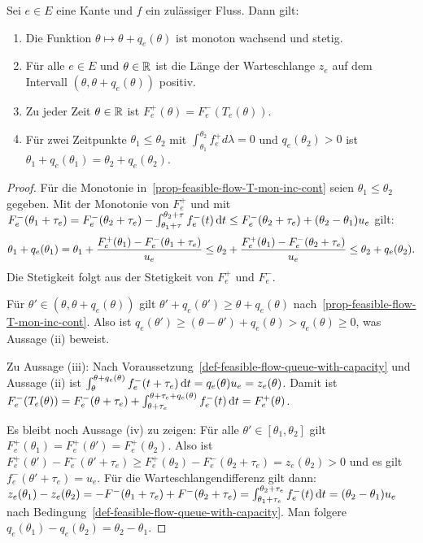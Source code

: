 \begin{proposition}\label{prop-feasible-flow}
	Sei $e\in E$ eine Kante und $f$ ein zulässiger Fluss. Dann gilt:
	\begin{enumerate}[label=(\roman*)]
		\item\label{prop-feasible-flow-T-mon-inc-cont} Die Funktion $\theta \mapsto \theta + q_e(\theta)$ ist monoton wachsend und stetig.
		\item\label{prop-feasible-flow-positive-queue} Für alle $e\in E$ und $\theta\in\mathbb{R}$ ist die Länge der Warteschlange $z_e$ auf dem Intervall $(\theta, \theta + q_e(\theta))$ positiv.
		\item\label{prop-feasible-flow-det-outflow} Zu jeder Zeit $\theta\in\mathbb{R}$ ist $F_e^+(\theta) = F_e^-(T_e(\theta))$.
		\item\label{prop-feasible-flow-queue-delay} Für zwei Zeitpunkte $\theta_1 \leq \theta_2$ mit $\int_{\theta_1}^{\theta_2} f^+_e d\lambda = 0$ und $q_e(\theta_2)>0$ ist $\theta_1 + q_e(\theta_1) = \theta_2 + q_e(\theta_2)$.
	\end{enumerate}
\end{proposition}
\begin{proof}
	Für die Monotonie in~\ref{prop-feasible-flow-T-mon-inc-cont} seien $\theta_1 \leq \theta_2$ gegeben.
	Mit der Monotonie von $F_e^+$ und mit $F_e^-(\theta_1 + \tau_e) = F_e^-(\theta_2+\tau_e) - \int_{\theta_1+\tau}^{\theta_2+\tau} f_e^-(t)\mathop{}\!\mathrm{d} t\leq F_e^-(\theta_2 + \tau_e) + (\theta_2 - \theta_1)u_e$ gilt: 
	$$
		\theta_1 + q_e(\theta_1)
		= \theta_1 + \frac{F_e^+(\theta_1) - F_e^-(\theta_1 + \tau_e)}{u_e}\\
		\leq \theta_2 + \frac{F_e^+(\theta_1) - F_e^-(\theta_2+\tau_e)}{u_e} \leq \theta_2 + q_e(\theta_2).
	$$
	Die Stetigkeit folgt aus der Stetigkeit von $F_e^+$ und $F_e^-$.
	
	Für $\theta'\in (\theta, \theta+q_e(\theta))$ gilt $\theta' + q_e(\theta') \geq \theta + q_e(\theta)$ nach~\ref{prop-feasible-flow-T-mon-inc-cont}.
	Also ist $q_e(\theta') \geq (\theta - \theta') + q_e(\theta) > q_e(\theta)\geq 0$, was Aussage (ii) beweist.	
	
	Zu Aussage (iii): Nach Voraussetzung~\ref{def-feasible-flow-queue-with-capacity} und Aussage (ii) ist
	$\int_{\theta}^{\theta + q_e(\theta)}f_e^-(t + \tau_e) \mathop{}\!\mathrm{d} t = q_e(\theta)  u_e = z_e(\theta)$.
	Damit ist $F_e^-(T_e(\theta)) = F_e^-(\theta+\tau_e) + \int_{\theta+\tau_e}^{\theta+\tau_e+q_e(\theta)}f_e^-(t)\mathop{}\!\mathrm{d} t = F_e^+(\theta)$.
	
	Es bleibt noch Aussage (iv) zu zeigen:
	Für alle $\theta'\in [\theta_1, \theta_2]$ gilt $F_e^+(\theta_1) = F_e^+(\theta') = F_e^+(\theta_2)$.
	Also ist $F_e^+(\theta') - F_e^-(\theta' + \tau_e) \geq F_e^+(\theta_2)-F_e^-(\theta_2 + \tau_e) = z_e(\theta_2) > 0$ und es gilt $f_e^-(\theta' + \tau_e)=u_e$.
	Für die Warteschlangendifferenz gilt dann: 
	$z_e(\theta_1)-z_e(\theta_2)=-F^-(\theta_1 + \tau_e) + F^-(\theta_2 + \tau_e) = \int_{\theta_1 + \tau_e}^{\theta_2 + \tau_e} f^-_e(t) \mathop{}\!\mathrm{d} t = (\theta_2 - \theta_1)u_e$ nach Bedingung~\ref{def-feasible-flow-queue-with-capacity}.
	Man folgere $q_e(\theta_1) - q_e(\theta_2) = \theta_2 - \theta_1$.
\end{proof}



